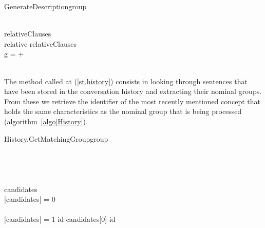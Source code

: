 \documentclass[11pt]{article}
\begin{document}
\begin{pseudocode}[ruled]{GenerateDescription}{group}
   
   \\  
   relativeClauses \GETS {} \\
   \FOREACH relative \in relativeClauses \DO
   	\BEGIN
   	  \GETS {} \\
   	 \FOREACH g \in {} \DO
     	 =  + {}
    \END\\
     
   \\
\ENDPROCEDURE
\end{pseudocode}

The method called at (\ref{st.history}) consists in looking through sentences 
that have been stored in the conversation history and extracting their nominal
groups. From these we retrieve the identifier of the most recently mentioned 
concept that holds the same characteristics as the nominal group that is being 
processed (algorithm~\ref{algo|History}).

\begin{pseudocode}[ruled]{History.GetMatchingGroup}{group}
\label{algo|History}
\\
 \GETS {}\\
 \\
 \\
	 \GETS {} \\ 
	
	candidates \GETS {} \cap {}\\
	\IF \left|{candidates}\right| = 0 \THEN
    \BEGIN
       \\
      \EXIT \\
    \END
   \ELSEIF \left|{candidates}\right| = 1 \THEN
      id \GETS candidates[0]
   \ELSE
   	  id \GETS {}\\
\ENDPROCEDURE
\end{pseudocode}
\end{document}
